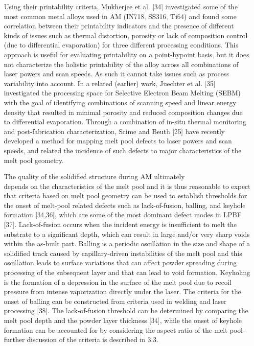 \documentclass[10pt]{article}
\begin{document}
Using their printability criteria, Mukherjee et al. [34] investigated some of the most common metal alloys used in AM (IN718, SS316, Ti64) and found some correlation between their printability indicators and the presence of different kinds of issues such as thermal distortion, porosity or lack of composition control (due to differential evaporation) for three different processing conditions. This approach is useful for evaluating printability on a point-bypoint basis, but it does not characterize the holistic printability of the alloy across all combinations of laser powers and scan speeds. As such it cannot take issues such as process variability into account. In a related (earlier) work, Juechter et al. [35] investigated the processing space for Selective Electron Beam Melting (SEBM) with the goal of identifying combinations of scanning speed and linear energy density that resulted in minimal porosity and reduced composition changes due to differential evaporation. Through a combination of in-situ thermal monitoring and post-fabrication characterization, Scime and Beuth [25] have recently developed a method for mapping melt pool defects to laser powers and scan speeds, and related the incidence of such defects to major characteristics of the melt pool geometry.

The quality of the solidified structure during AM ultimately\\
depends on the characteristics of the melt pool and it is thus reasonable to expect that criteria based on melt pool geometry can be used to establish thresholds for the onset of melt-pool related defects such as lack-of-fusion, balling, and keyhole formation [34,36], which are some of the most dominant defect modes in LPBF [37]. Lack-of-fusion occurs when the incident energy is insufficient to melt the substrate to a significant depth, which can result in large and/or very sharp voids within the as-built part. Balling is a periodic oscillation in the size and shape of a solidified track caused by capillary-driven instabilities of the melt pool and this oscillation leads to surface variations that can affect powder spreading during processing of the subsequent layer and that can lead to void formation. Keyholing is the formation of a depression in the surface of the melt pool due to recoil pressure from intense vaporization directly under the laser. The criteria for the onset of balling can be constructed from criteria used in welding and laser processing [38]. The lack-of-fusion threshold can be determined by comparing the melt pool depth and the powder layer thickness [34], while the onset of keyhole formation can be accounted for by considering the aspect ratio of the melt pool-further discussion of the criteria is described in 3.3.
\end{document}
